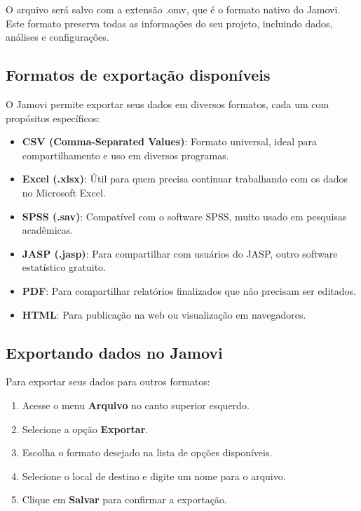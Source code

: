 O arquivo será salvo com a extensão .omv, que é o formato nativo do Jamovi. Este formato preserva todas as informações do seu projeto, incluindo dados, análises e configurações.

\subsection{Formatos de exportação disponíveis}

O Jamovi permite exportar seus dados em diversos formatos, cada um com propósitos específicos:

\begin{itemize}
    \item \textbf{CSV (Comma-Separated Values)}: Formato universal, ideal para compartilhamento e uso em diversos programas.
    \item \textbf{Excel (.xlsx)}: Útil para quem precisa continuar trabalhando com os dados no Microsoft Excel.
    \item \textbf{SPSS (.sav)}: Compatível com o software SPSS, muito usado em pesquisas acadêmicas.
    \item \textbf{JASP (.jasp)}: Para compartilhar com usuários do JASP, outro software estatístico gratuito.
    \item \textbf{PDF}: Para compartilhar relatórios finalizados que não precisam ser editados.
    \item \textbf{HTML}: Para publicação na web ou visualização em navegadores.
\end{itemize}

\subsection{Exportando dados no Jamovi}

Para exportar seus dados para outros formatos:

\begin{enumerate}
    \item Acesse o menu \textbf{Arquivo} no canto superior esquerdo.
    \item Selecione a opção \textbf{Exportar}.
    \item Escolha o formato desejado na lista de opções disponíveis.
    \item Selecione o local de destino e digite um nome para o arquivo.
    \item Clique em \textbf{Salvar} para confirmar a exportação.
\end{enumerate}


